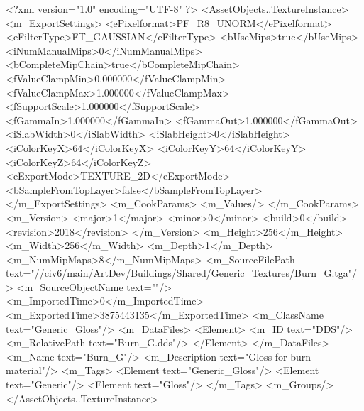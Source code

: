 <?xml version="1.0" encoding="UTF-8" ?>
<AssetObjects..TextureInstance>
	<m_ExportSettings>
		<ePixelformat>PF_R8_UNORM</ePixelformat>
		<eFilterType>FT_GAUSSIAN</eFilterType>
		<bUseMips>true</bUseMips>
		<iNumManualMips>0</iNumManualMips>
		<bCompleteMipChain>true</bCompleteMipChain>
		<fValueClampMin>0.000000</fValueClampMin>
		<fValueClampMax>1.000000</fValueClampMax>
		<fSupportScale>1.000000</fSupportScale>
		<fGammaIn>1.000000</fGammaIn>
		<fGammaOut>1.000000</fGammaOut>
		<iSlabWidth>0</iSlabWidth>
		<iSlabHeight>0</iSlabHeight>
		<iColorKeyX>64</iColorKeyX>
		<iColorKeyY>64</iColorKeyY>
		<iColorKeyZ>64</iColorKeyZ>
		<eExportMode>TEXTURE_2D</eExportMode>
		<bSampleFromTopLayer>false</bSampleFromTopLayer>
	</m_ExportSettings>
	<m_CookParams>
		<m_Values/>
	</m_CookParams>
	<m_Version>
		<major>1</major>
		<minor>0</minor>
		<build>0</build>
		<revision>2018</revision>
	</m_Version>
	<m_Height>256</m_Height>
	<m_Width>256</m_Width>
	<m_Depth>1</m_Depth>
	<m_NumMipMaps>8</m_NumMipMaps>
	<m_SourceFilePath text="//civ6/main/ArtDev/Buildings/Shared/Generic_Textures/Burn_G.tga"/>
	<m_SourceObjectName text=""/>
	<m_ImportedTime>0</m_ImportedTime>
	<m_ExportedTime>3875443135</m_ExportedTime>
	<m_ClassName text="Generic_Gloss"/>
	<m_DataFiles>
		<Element>
			<m_ID text="DDS"/>
			<m_RelativePath text="Burn_G.dds"/>
		</Element>
	</m_DataFiles>
	<m_Name text="Burn_G"/>
	<m_Description text="Gloss for burn material"/>
	<m_Tags>
		<Element text="Generic_Gloss"/>
		<Element text="Generic"/>
		<Element text="Gloss"/>
	</m_Tags>
	<m_Groups/>
</AssetObjects..TextureInstance>

